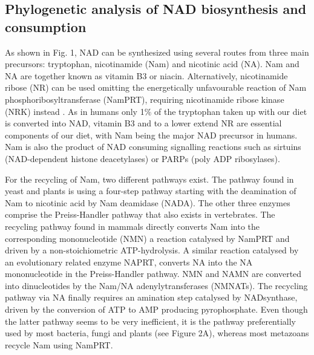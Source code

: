 \documentclass[paper=a4, 12pt]{scrartcl}
\begin{document}
\subsection{Phylogenetic analysis of NAD biosynthesis and consumption}

As shown in Fig. 1, NAD can be synthesized using several routes from three main precursors: tryptophan, nicotinamide (Nam) and nicotinic acid (NA). Nam and NA are together known as vitamin B3 or niacin. Alternatively, nicotinamide ribose (NR) can be used omitting the energetically unfavourable reaction of Nam phosphoribosyltransferase (NamPRT), requiring nicotinamide ribose kinase (NRK) instead \cite{Bogan2008}. As in humans only 1\% of the tryptophan taken up with our diet is converted into NAD, vitamin B3 and to a lower extend NR are essential components of our diet, with Nam being the major NAD precursor in humans. Nam is also the product of NAD consuming signalling reactions such as sirtuins (NAD-dependent histone deacetylases) or PARPs (poly ADP ribosylases).

For the recycling of Nam, two different pathways exist. The pathway found in yeast and plants is using a four-step pathway starting with the deamination of Nam to nicotinic acid by Nam deamidase (NADA). The other three enzymes comprise the Preiss-Handler pathway that also exists in vertebrates. The recycling pathway found in mammals directly converts Nam into the corresponding mononucleotide (NMN) a reaction catalysed by NamPRT and driven by a non-stoichiometric ATP-hydrolysis. A similar reaction catalysed by an evolutionary related enzyme NAPRT, converts NA into the NA mononucleotide in the Preiss-Handler pathway. NMN and NAMN are converted into dinucleotides by the Nam/NA adenylytransferases (NMNATs). The recycling pathway via NA finally requires an amination step catalysed by NADsynthase, driven by the conversion of ATP to AMP producing pyrophosphate. Even though the latter pathway seems to be very inefficient, it is the pathway preferentially used by most bacteria, fungi and plants (see Figure 2A), whereas most metazoans recycle Nam using NamPRT.
\end{document}
